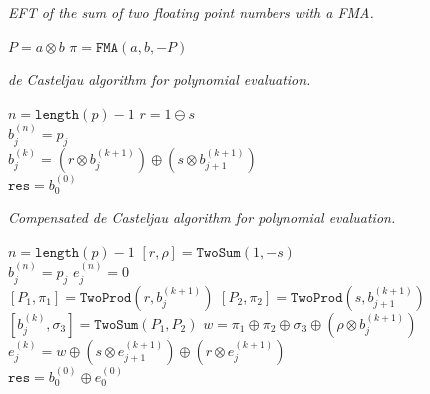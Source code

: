 \documentclass[letterpaper,10pt]{article}
\begin{document}
\begin{algorithm}[H]
  \caption{\textit{EFT of the sum of two floating point numbers with a FMA.}}

  \begin{algorithmic}
      \State \(P = a \otimes b\)
      \State \(\pi = \mathtt{FMA}(a, b, -P)\)
    \EndFunction
  \end{algorithmic}
\end{algorithm}

\begin{algorithm}[H]
  \caption{\textit{de Casteljau algorithm for polynomial evaluation.}}

  \begin{algorithmic}
      \State \(n = \texttt{length}(p) - 1\)
      \State \(r = 1 \ominus s\)
      \\
        \State \(b_j^{(n)} = p_j\)
      \EndFor
      \\
          \State \(b_j^{(k)} = \left(r \otimes b_j^{(k + 1)}\right) \oplus
              \left(s \otimes b_{j + 1}^{(k + 1)}\right)\)
        \EndFor
      \EndFor
      \\
      \State \(\mathtt{res} = b_0^{(0)}\)
    \EndFunction
  \end{algorithmic}
\end{algorithm}

\begin{algorithm}[H]
  \caption{\textit{Compensated de Casteljau algorithm for polynomial evaluation.}}

  \begin{algorithmic}
      \State \(n = \texttt{length}(p) - 1\)
      \State \(\left[r, \rho\right] = \mathtt{TwoSum}(1, -s)\)
      \\
        \State \(b_j^{(n)} = p_j\)
        \State \(e_j^{(n)} = 0\)
      \EndFor
      \\
          \State \(\left[P_1, \pi_1\right] = \mathtt{TwoProd}\left(
              r, b_j^{(k + 1)}\right)\)
          \State \(\left[P_2, \pi_2\right] = \mathtt{TwoProd}\left(
              s, b_{j + 1}^{(k + 1)}\right)\)
          \State \(\left[b_j^{(k)}, \sigma_3\right] = \mathtt{TwoSum}(
              P_1, P_2)\)
          \State \(w = \pi_1 \oplus \pi_2 \oplus \sigma_3 \oplus
              \left(\rho \otimes b_j^{(k + 1)}\right)\)
          \State \(e_j^{(k)} = w \oplus \left(s \otimes e_{j + 1}^{(k + 1)}
              \right) \oplus \left(r \otimes e_j^{(k + 1)}\right)\)
        \EndFor
      \EndFor
      \\
      \State \(\mathtt{res} = b_0^{(0)} \oplus e_0^{(0)}\)
    \EndFunction
  \end{algorithmic}
\end{algorithm}
\end{document}
